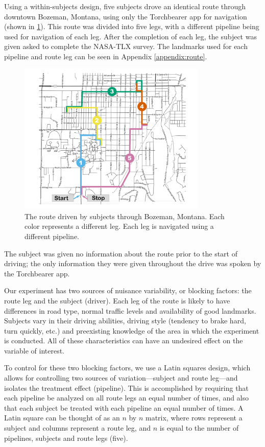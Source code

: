 Using a within-subjects design, five subjects drove an identical route through downtown Bozeman, Montana, using only the Torchbearer app for navigation (shown in \ref{fig:route}). This route was divided into five legs, with a different pipeline being used for navigation of each leg. After the completion of each leg, the subject was given asked to complete the NASA-TLX survey. The landmarks used for each pipeline and route leg can be seen in Appendix \ref{appendix:route}.

\begin{figure}[htbp]
  \centering
  \includegraphics[width=0.8\textwidth]{images/route.pdf}
  \caption{The route driven by subjects through Bozeman, Montana. Each color represents a different leg. Each leg is navigated using a different pipeline.}
  \label{fig:route}
\end{figure}

The subject was given no information about the route prior to the start of driving; the only information they were given throughout the drive was spoken by the Torchbearer app. 

Our experiment has two sources of nuisance variability, or blocking factors: the route leg and the subject (driver). Each leg of the route is likely to have differences in road type, normal traffic levels and availability of good landmarks. Subjects vary in their driving abilities, driving style (tendency to brake hard, turn quickly, etc.) and preexisting knowledge of the area in which the experiment is conducted. All of these characteristics can have an undesired effect on the variable of interest. 

To control for these two blocking factors, we use a Latin squares design, which allows for controlling two sources of variation---subject and route leg---and isolates the treatment effect (pipeline). This is accomplished by requiring that each pipeline be analyzed on all route legs an equal number of times, and also that each subject be treated with each pipeline an equal number of times. A Latin square can be thought of as an $n$ by $n$ matrix, where rows represent a subject and columns represent a route leg, and $n$ is equal to the number of pipelines, subjects and route legs (five).

